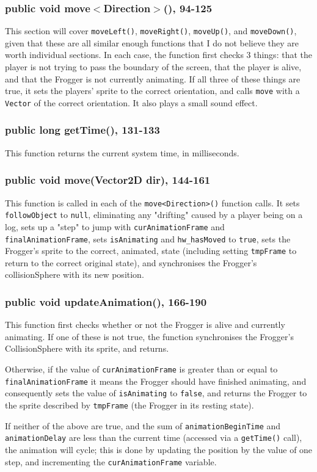\documentclass[12pt]{article}
\begin{document}
\subsubsection{public void move$<$Direction$>$(), 94-125}
This section will cover \verb|moveLeft()|, \verb|moveRight()|, \verb|moveUp()|, and \verb|moveDown()|, given that these are all similar enough functions that I do not believe they are worth individual sections.
In each case, the function first checks 3 things: that the player is not trying to pass the boundary of the screen, that the player is alive, and that the Frogger is not currently animating.
If all three of these things are true, it sets the players' sprite to the correct orientation, and calls \verb|move| with a \verb|Vector| of the correct orientation.
It also plays a small sound effect.

\subsubsection{public long getTime(), 131-133}
This function returns the current system time, in milliseconds.

\subsubsection{public void move(Vector2D dir), 144-161}
This function is called in each of the \verb|move<Direction>()| function calls.
It sets \verb|followObject| to \verb|null|, eliminating any "drifting" caused by a player being on a log, sets up a "step" to jump with \verb|curAnimationFrame| and \verb|finalAnimationFrame|, sets \verb|isAnimating| and \verb|hw_hasMoved| to \verb|true|, sets the Frogger's sprite to the correct, animated, state (including setting \verb|tmpFrame| to return to the correct original state), and synchronises the Frogger's collisionSphere with its new position.

\subsubsection{public void updateAnimation(), 166-190}
This function first checks whether or not the Frogger is alive and currently animating.
If one of these is not true, the function synchronises the Frogger's CollisionSphere with its sprite, and returns.
\par
Otherwise, if the value of \verb|curAnimationFrame| is greater than or equal to \verb|finalAnimationFrame| it means the Frogger should have finished animating, and consequently sets the value of \verb|isAnimating| to \verb|false|, and returns the Frogger to the sprite described by \verb|tmpFrame| (the Frogger in its resting state).
\par
If neither of the above are true, and the sum of \verb|animationBeginTime| and \verb|animationDelay| are less than the current time (accessed via a \verb|getTime()| call), the animation will cycle; this is done by updating the position by the value of one step, and incrementing the \verb|curAnimationFrame| variable.
\end{document}
